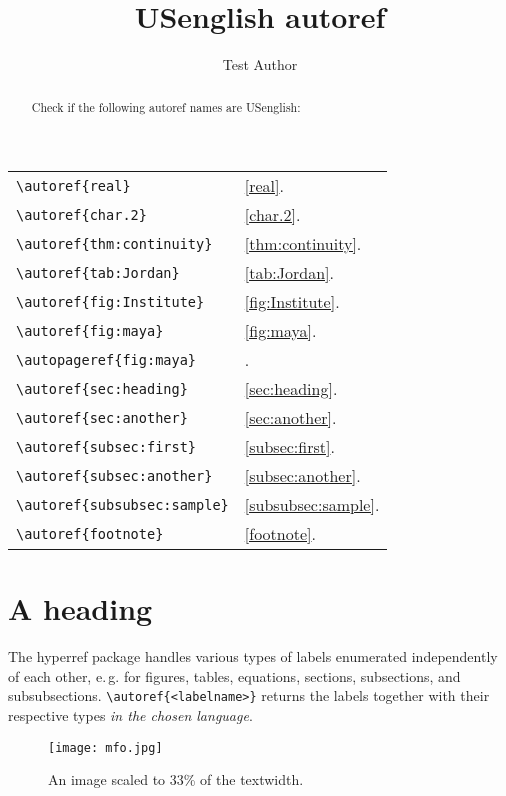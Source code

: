 \documentclass{snapshotmfo}
\author{Test Author}
\title{USenglish autoref}
\begin{document}

\begin{abstract}
	Check if the following autoref names are USenglish:
\end{abstract}

\noindent\begin{tabular}{@{}l@{\quad yields\quad}l@{}}
	\verb+\autoref{real}+             &\autoref{real}.\\
	\verb+\autoref{char.2}+           &\autoref{char.2}.\\
	\verb+\autoref{thm:continuity}+   &\autoref{thm:continuity}.\\
	\verb+\autoref{tab:Jordan}+       &\autoref{tab:Jordan}.\\
	\verb+\autoref{fig:Institute}+    &\autoref{fig:Institute}.\\
	\verb+\autoref{fig:maya}+         &\autoref{fig:maya}.\\
	\verb+\autopageref{fig:maya}+     &\autopageref{fig:maya}.\\
	\verb+\autoref{sec:heading}+      &\autoref{sec:heading}.\\
	\verb+\autoref{sec:another}+      &\autoref{sec:another}.\\
	\verb+\autoref{subsec:first}+     &\autoref{subsec:first}.\\
	\verb+\autoref{subsec:another}+   &\autoref{subsec:another}.\\
	\verb+\autoref{subsubsec:sample}+ &\autoref{subsubsec:sample}.\\
	\verb+\autoref{footnote}+         &\autoref{footnote}.\\
\end{tabular}


\section{A heading}
\label{sec:heading}
The hyperref package handles various types of labels enumerated independently of each other, e.\,g.
for figures, tables, equations, sections, subsections, and subsubsections.
\verb+\autoref{<labelname>}+ returns the labels together with their respective types {\em in the chosen language}.

\begin{figure}[ht]
	\centering
	\texttt{[image: mfo.jpg]}
	\caption{An image scaled to 33\% of the textwidth.}
	\label{fig:Institute}
\end{figure}
\end{document}
